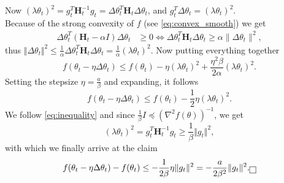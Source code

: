 Now $(\lambda \theta_t)^2 = g_t^T \mathbf{H}_t^{-1} g_t  = \Delta \theta_t^T \mathbf{H}_t \Delta \theta_t$, and $g_t^T \Delta \theta_t =(\lambda\theta_t)^2 $. \\
Because of the strong convexity of $f$ (see \ref{eq:convex_smooth}) we get
\begin{align}
    \label{eq:inequality}
    \Delta \theta_t^T (\mathbf{H}_t - \alpha I) \Delta \theta_t &\geq 0 
    \Longleftrightarrow \Delta \theta_t^T \mathbf{H}_t \Delta \theta_t   \geq \alpha \|\Delta \theta_t\|^2,
\end{align}
thus $  \Vert \Delta \theta_t \Vert ^2 \leq  \frac{1}{\alpha} \Delta \theta_t^T \mathbf{H}_t \Delta \theta_t = \frac{1}{\alpha} (\lambda \theta_t)^2 $.
Now putting everything together
\begin{equation}
    f(\theta_t - \eta\Delta \theta_t) \leq f(\theta_t) - \eta (\lambda \theta_t)^2 + \frac{\eta^2\beta}{2\alpha} (\lambda \theta_t)^2.
\end{equation}
Setting the stepsize $\eta = \frac{a}{\beta}$ and expanding, it follows
\begin{equation}
    f(\theta_t - \eta\Delta \theta_t) \leq f(\theta_t) - \frac{1}{2} \eta (\lambda \theta_t)^2 .
\end{equation}
We follow \ref{eq:inequality} and since $\frac{1}{\beta}I \preceq (\nabla^2 f(\theta))^{-1}  $, we get
\begin{equation}
    (\lambda \theta_t)^2 = g_t^T \mathbf{H}_t^{-1} g_t \geq \frac{1}{\beta} \Vert g_t \Vert ^2,
\end{equation}
with which we finally arrive at the claim
\begin{equation}
    f(\theta_t - \eta\Delta \theta_t) - f(\theta_t) \leq -\frac{1}{2 \beta} \eta \Vert g_t\Vert^2 =  -\frac{a}{2 \beta^{2}}  \Vert g_t\Vert^2.
     \hfill \fbox{\phantom{\rule{.2ex}{.2ex}}}
\end{equation}

